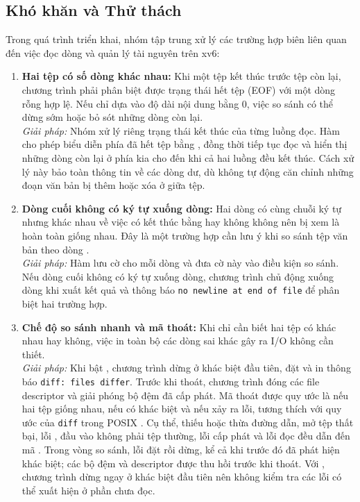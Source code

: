 \subsection{Khó khăn và Thử thách}
Trong quá trình triển khai, nhóm tập trung xử lý các trường hợp biên liên quan đến việc
đọc dòng và quản lý tài nguyên trên xv6:

\begin{enumerate}[noitemsep, topsep=2pt]
    \item \textbf{Hai tệp có số dòng khác nhau:}
    Khi một tệp kết thúc trước tệp còn lại, chương trình phải phân biệt được trạng thái
    hết tệp (EOF) với một dòng rỗng hợp lệ. Nếu chỉ dựa vào độ dài nội dung bằng 0, việc
    so sánh có thể dừng sớm hoặc bỏ sót những dòng còn lại. \\
    \textit{Giải pháp:} Nhóm xử lý riêng trạng thái kết thúc của từng luồng đọc. Hàm
     cho phép biểu diễn phía đã hết tệp bằng , đồng thời
    tiếp tục đọc và hiển thị những dòng còn lại ở phía kia cho đến khi cả hai luồng đều
    kết thúc. Cách xử lý này bảo toàn thông tin về các dòng dư, dù không tự động căn
    chỉnh những đoạn văn bản bị thêm hoặc xóa ở giữa tệp.

    \item \textbf{Dòng cuối không có ký tự xuống dòng:}
    Hai dòng có cùng chuỗi ký tự nhưng khác nhau về việc có kết thúc bằng
     hay không không nên bị xem là hoàn toàn giống nhau. Đây là
    một trường hợp cần lưu ý khi so sánh tệp văn bản theo dòng \cite{posix2018diff}. \\
    \textit{Giải pháp:} Hàm  lưu cờ  cho mỗi dòng và
    đưa cờ này vào điều kiện so sánh. Nếu dòng cuối không có ký tự xuống dòng, chương
    trình chủ động xuống dòng khi xuất kết quả và thông báo \texttt{no newline at end of
    file} để phân biệt hai trường hợp.

    \item \textbf{Chế độ so sánh nhanh và mã thoát:}
    Khi chỉ cần biết hai tệp có khác nhau hay không, việc in toàn bộ các dòng sai khác
    gây ra I/O không cần thiết. \\
    \textit{Giải pháp:} Khi bật , chương trình dừng ở khác biệt đầu tiên, đặt
     và in thông báo \texttt{diff: files differ}. Trước khi thoát,
    chương trình đóng các file descriptor và giải phóng bộ đệm đã cấp phát. Mã thoát
    được quy ước là  nếu hai tệp giống nhau,  nếu có khác biệt và
     nếu xảy ra lỗi, tương thích với quy ước của \texttt{diff} trong POSIX
    \cite{posix2018diff}. Cụ thể, thiếu hoặc thừa đường dẫn, mở tệp thất bại,
    lỗi , đầu vào không phải tệp thường, lỗi cấp phát và lỗi đọc
    đều dẫn đến mã . Trong vòng so sánh, lỗi đặt 
    rồi dừng, kể cả khi trước đó đã phát hiện khác biệt; các bộ đệm và descriptor
    được thu hồi trước khi thoát. Với , chương trình dừng ngay ở khác biệt
    đầu tiên nên không kiểm tra các lỗi có thể xuất hiện ở phần chưa đọc.
\end{enumerate}

